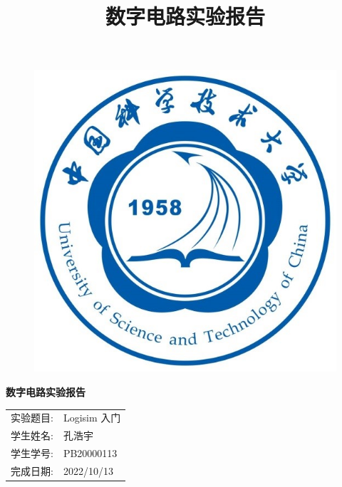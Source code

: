 \documentclass{article}
\title{\heiti 数字电路实验报告 }
\begin{document}
	\vspace*{1cm}
	
	\begin{figure}[h]
		\centering
		\includegraphics[scale=1.0]{xh.jpg}
	\end{figure}

	\vspace*{0.5cm}
	
	\begin{center}
		\Huge{\textbf{数字电路实验报告}}
	\end{center}
	
	\vspace{5cm}
	
	\begin{table}[h]
		\centering
		\begin{Large}
			\begin{tabular}{p{3cm} p{7cm}<{\centering}}
				实验题目: &  Logisim 入门     \\ \cline{2-2}
				学生姓名:      & 孔浩宇   \\ \cline{2-2}
				学生学号: & PB20000113 \\ \cline{2-2}
				完成日期:       & 2022/10/13 \\ \cline{2-2}
			\end{tabular}
		\end{Large}		
	\end{table}
	\newpage
\end{document}
